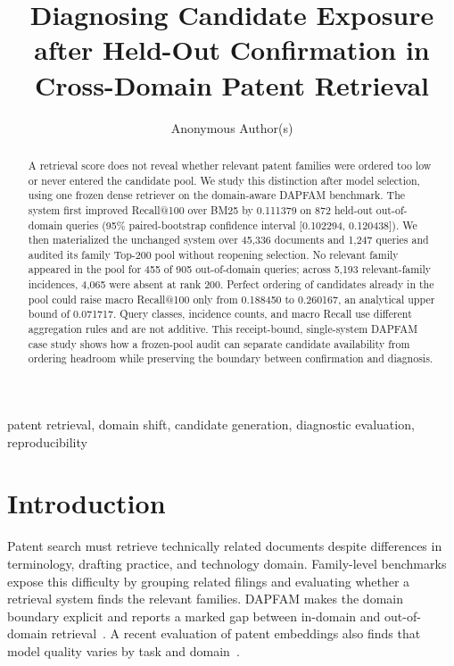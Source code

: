 \documentclass[a4paper,conference]{IEEEtran}
\begin{document}
\title{Diagnosing Candidate Exposure after Held-Out Confirmation in Cross-Domain Patent Retrieval}
\author{Anonymous Author(s)}
\maketitle

\begin{abstract}
A retrieval score does not reveal whether relevant patent families were ordered
too low or never entered the candidate pool. We study this distinction after
model selection, using one frozen dense retriever on the domain-aware DAPFAM
benchmark. The system first improved Recall@100 over BM25 by 0.111379 on 872
held-out out-of-domain queries (95\% paired-bootstrap confidence interval
[0.102294, 0.120438]). We then materialized the unchanged system over 45,336
documents and 1,247 queries and audited its family Top-200 pool without
reopening selection. No relevant family appeared in the pool for 455 of 905
out-of-domain queries; across 5,193 relevant-family incidences, 4,065 were
absent at rank 200. Perfect ordering of candidates already in the pool could
raise macro Recall@100 only from 0.188450 to 0.260167, an analytical upper
bound of 0.071717. Query classes, incidence counts, and macro Recall use
different aggregation rules and are not additive. This receipt-bound,
single-system DAPFAM case study shows how a frozen-pool audit can separate
candidate availability from ordering headroom while preserving the boundary
between confirmation and diagnosis.
\end{abstract}

\begin{IEEEkeywords}
patent retrieval, domain shift, candidate generation, diagnostic evaluation,
reproducibility
\end{IEEEkeywords}

\section{Introduction}
Patent search must retrieve technically related documents despite differences
in terminology, drafting practice, and technology domain. Family-level
benchmarks expose this difficulty by grouping related filings and evaluating
whether a retrieval system finds the relevant families. DAPFAM makes the domain
boundary explicit and reports a marked gap between in-domain and out-of-domain
retrieval~\cite{ayaou2025dapfam}. A recent evaluation of patent embeddings also
finds that model quality varies by task and domain~\cite{yousefiramandi2026patent}.
\end{document}
